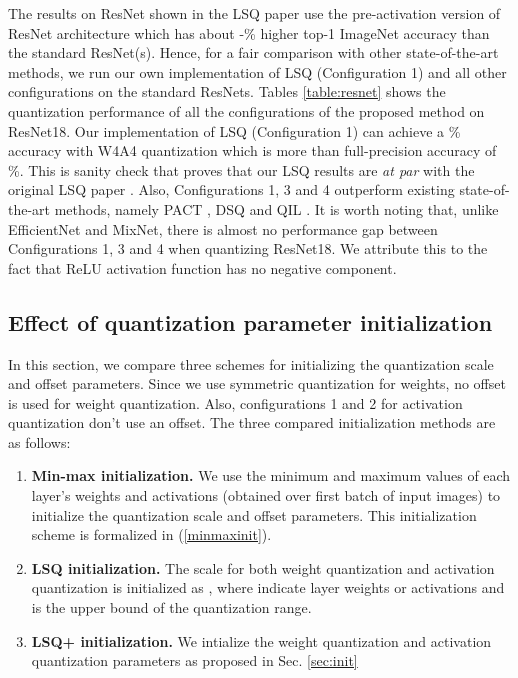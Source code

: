 \documentclass[10pt,twocolumn,letterpaper]{article}
\begin{document}
The results on ResNet shown in the LSQ paper \cite{lsq} use the pre-activation version of ResNet architecture \cite{resnet2} which has about -\% higher top-1 ImageNet accuracy than the standard ResNet(s). Hence, for a fair comparison with other state-of-the-art methods, we run our own implementation of LSQ (Configuration 1) and all other configurations on the standard ResNets. Tables \ref{table:resnet} shows the quantization performance of all the configurations of the proposed method on ResNet18. Our implementation of LSQ (Configuration 1) can achieve a \% accuracy with W4A4 quantization which is more than full-precision accuracy of \%. This is sanity check that proves that our LSQ results are \textit{at par} with the original LSQ paper \cite{lsq}. Also, Configurations 1, 3 and 4 outperform existing state-of-the-art methods, namely PACT \cite{pact2018}, DSQ \cite{dsq} and QIL \cite{qil}. It is worth noting that, unlike EfficientNet and MixNet, there is almost no performance gap between Configurations 1, 3 and 4 when quantizing ResNet18. We attribute this to the fact that ReLU activation function has no negative component.  


\subsection{Effect of quantization parameter initialization}
\label{results:init}
In this section, we compare three schemes for initializing the quantization scale and offset parameters. Since we use symmetric quantization for weights, no offset is used for weight quantization. Also, configurations 1 and 2 for activation quantization don't use an offset.
The three compared initialization methods are as follows:

\begin{enumerate}
\itemsep0pt
    \item \textbf{Min-max initialization.} We use the minimum and maximum values of each layer's weights and activations (obtained over first batch of input images) to initialize the quantization scale and offset parameters. This initialization scheme is formalized in (\ref{minmaxinit}).
    \item \textbf{LSQ initialization.} The scale for both weight quantization and activation quantization is initialized as , where  indicate layer weights or activations and  is the upper bound of the quantization range.
    \item \textbf{LSQ+ initialization.} We intialize the weight quantization and activation quantization parameters as proposed in Sec. \ref{sec:init}
\end{enumerate}
\end{document}
